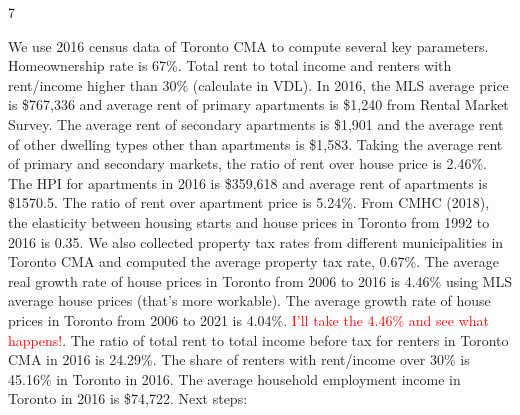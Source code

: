 7\documentclass[parskip=full]{article}
\begin{document}
We use 2016 census data of Toronto CMA to compute several key parameters. Homeownership rate is 67\%. Total rent to total income and renters with rent/income higher than 30\% (calculate in VDL). In 2016, the MLS average price is \$767,336 and average rent of primary apartments is \$1,240 from Rental Market Survey. The average rent of secondary apartments is \$1,901 and the average rent of other dwelling types other than apartments is \$1,583. Taking the average rent of primary and secondary markets, the ratio of rent over house price is 2.46\%. The HPI for apartments in 2016 is \$359,618 and average rent of apartments is \$1570.5. The ratio of rent over apartment price is 5.24\%. 
From CMHC (2018), the elasticity between housing starts and house prices in Toronto from 1992 to 2016 is 0.35. We also collected property tax rates from different municipalities in Toronto CMA and computed the average property tax rate, 0.67\%. The average real growth rate of house prices in Toronto from 2006 to 2016 is 4.46\% using MLS average house prices (that's more workable). The average growth rate of house prices in Toronto from 2006 to 2021 is 4.04\%. \textcolor{red}{I'll take the 4.46\% and see what happens!}. The ratio of total rent to total income before tax for renters in Toronto CMA in 2016 is 24.29\%. The share of renters with rent/income over 30\% is 45.16\% in Toronto in 2016. The average household employment income in Toronto in 2016 is \$74,722. 
Next steps:
\end{document}
